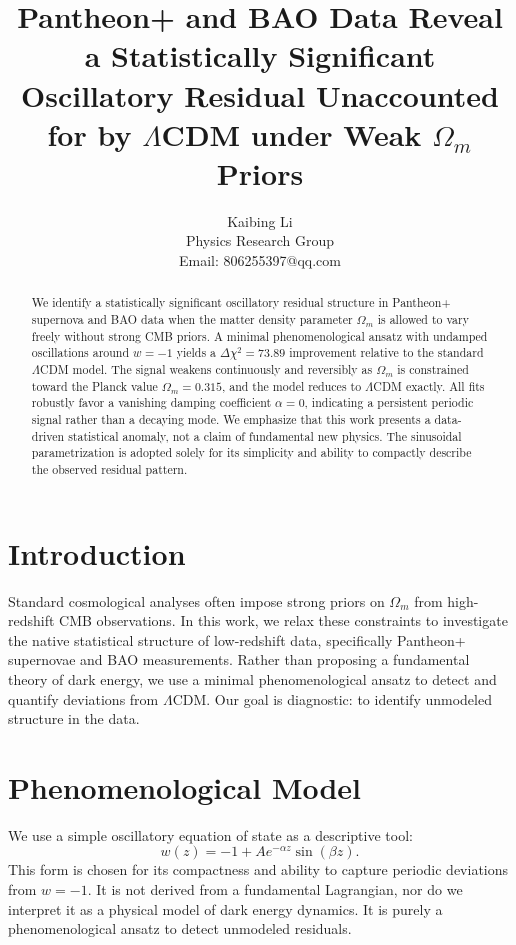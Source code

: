\documentclass[10pt,a4paper,twocolumn]{article}
\begin{document}
\title{Pantheon+ and BAO Data Reveal a Statistically Significant Oscillatory Residual
Unaccounted for by $\Lambda$CDM under Weak $\Omega_m$ Priors}
\author{Kaibing Li\\
Physics Research Group\\
Email: 806255397@qq.com}
\date{}
\maketitle

\begin{abstract}
We identify a statistically significant oscillatory residual structure in Pantheon+ supernova and BAO data when the matter density parameter $\Omega_m$ is allowed to vary freely without strong CMB priors. A minimal phenomenological ansatz with undamped oscillations around $w=-1$ yields a $\Delta\chi^2 = 73.89$ improvement relative to the standard $\Lambda$CDM model. The signal weakens continuously and reversibly as $\Omega_m$ is constrained toward the Planck value $\Omega_m = 0.315$, and the model reduces to $\Lambda$CDM exactly. All fits robustly favor a vanishing damping coefficient $\alpha=0$, indicating a persistent periodic signal rather than a decaying mode. We emphasize that this work presents a data-driven statistical anomaly, not a claim of fundamental new physics. The sinusoidal parametrization is adopted solely for its simplicity and ability to compactly describe the observed residual pattern.
\end{abstract}

\section{Introduction}
Standard cosmological analyses often impose strong priors on $\Omega_m$ from high-redshift CMB observations.
In this work, we relax these constraints to investigate the native statistical structure of low-redshift data,
specifically Pantheon+ supernovae and BAO measurements.
Rather than proposing a fundamental theory of dark energy,
we use a minimal phenomenological ansatz to detect and quantify deviations from $\Lambda$CDM.
Our goal is diagnostic: to identify unmodeled structure in the data.

\section{Phenomenological Model}
We use a simple oscillatory equation of state as a descriptive tool:
\[
w(z) = -1 + A e^{-\alpha z}\sin(\beta z).
\]
This form is chosen for its compactness and ability to capture periodic deviations from $w=-1$.
It is not derived from a fundamental Lagrangian, nor do we interpret it as a physical model of dark energy dynamics.
It is purely a phenomenological ansatz to detect unmodeled residuals.
\end{document}
